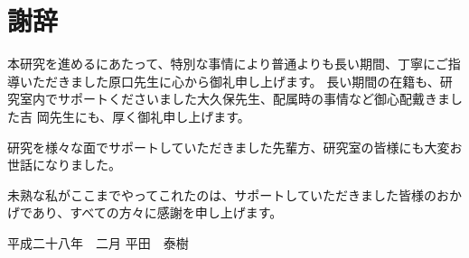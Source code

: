 \chapter*{謝辞}
本研究を進めるにあたって、特別な事情により普通よりも長い期間、丁寧にご指導いただきました原口先生に心から御礼申し上げます。
長い期間の在籍も、研究室内でサポートくださいました大久保先生、配属時の事情など御心配戴きました吉
岡先生にも、厚く御礼申し上げます。

研究を様々な面でサポートしていただきました先輩方、研究室の皆様にも大変お世話になりました。

未熟な私がここまでやってこれたのは、サポートしていただきました皆様のおかげであり、すべての方々に感謝を申し上げます。

\begin{flushright}
  平成二十八年　二月
      平田　泰樹
\end{flushright}
